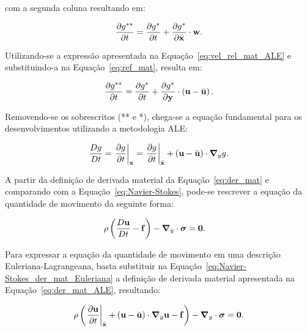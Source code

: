 \noindent com a segunda coluna resultando em:

\begin{align}
	\frac{\partial g^{**}}{\partial t} = \frac{\partial g^*}{\partial t} + \frac{\partial g^*}{\partial \bar{\mathbf{x}}} \cdot \mathbf{w}. \label{eq:ref_mat}
\end{align}

Utilizando-se a expressão apresentada na Equação~\eqref{eq:vel_rel_mat_ALE} e substituindo-a na Equação~\eqref{eq:ref_mat}, resulta em:

\begin{align}
	\frac{\partial g^{**}}{\partial t} = \frac{\partial g^*}{\partial t} + \frac{\partial g^*}{\partial \mathbf{y}} \cdot \left(\mathbf{u} - \bar{\mathbf{u}} \right). 
\end{align}

Removendo-se os sobrescritos (** e *), chega-se a equação fundamental para os desenvolvimentos utilizando a metodologia ALE:

\begin{align}
	\frac{Dg}{Dt} = \left . \frac{\partial g}{\partial t} \right|_{\mathbf{x}} = \left . \frac{\partial g}{\partial t} \right|_{\bar{\mathbf{x}}} + \left(\mathbf{u} - \bar{\mathbf{u}} \right) \cdot \boldsymbol{\nabla}_y g. \label{eq:der_mat_ALE}
\end{align}

A partir da definição de derivada material da Equação~\eqref{eq:der_mat} e comparando com a Equação~\eqref{eq:Navier-Stokes}, pode-se rescrever a equação da quantidade de movimento da seguinte forma:

\begin{align}
	\rho\left(\frac{D\mathbf{u}}{Dt} - \mathbf{f} \right) - \boldsymbol{\nabla}_y \cdot \boldsymbol{\sigma} &= \mathbf{0}. \label{eq:Navier-Stokes_der_mat_Euleriana}
\end{align}

Para expressar a equação da quantidade de movimento em uma descrição Euleriana-Lagrangeana, basta substituir na Equação~\eqref{eq:Navier-Stokes_der_mat_Euleriana} a definição de derivada material apresentada na Equação~\eqref{eq:der_mat_ALE}, resultando:

\begin{align}
	\rho\left(\left. \frac{\partial\mathbf{u}}{\partial t} \right|_{\bar{\mathbf{x}}} + \left(\mathbf{u} - \bar{\mathbf{u}} \right) \cdot \boldsymbol{\nabla}_y  \mathbf{u}  - \mathbf{f} \right) - \boldsymbol{\nabla}_y \cdot \boldsymbol{\sigma} = \mathbf{0}. \label{eq:Navier-Stokes_ALE} 
\end{align}

